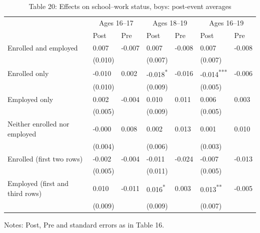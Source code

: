 \documentclass[12pt]{article}
\begin{document}
\begin{table}
\centering
\caption{Table 20: Effects on school--work status, boys: post-event averages}

\small
\begin{tabular}{p{}p{}p{}p{}p{}p{}p{}}
\toprule
 & \multicolumn{2}{c}{Ages 16--17} & \multicolumn{2}{c}{Ages 18--19} & \multicolumn{2}{c}{Ages 16--19} \\

 & Post & Pre & Post & Pre & Post & Pre \\
\midrule
Enrolled and employed & 0.007 & -0.007 & 0.007 & -0.008 & 0.007 & -0.008 \\
 & (0.010) &  & (0.007) &  & (0.007) &  \\
Enrolled only & -0.010 & 0.002 & -0.018\textsuperscript{*} & -0.016 & -0.014\textsuperscript{***} & -0.006 \\
 & (0.010) &  & (0.009) &  & (0.005) &  \\
Employed only & 0.002 & -0.004 & 0.010 & 0.011 & 0.006 & 0.003 \\
 & (0.005) &  & (0.009) &  & (0.005) &  \\
Neither enrolled nor employed & -0.000 & 0.008 & 0.002 & 0.013 & 0.001 & 0.010 \\
 & (0.004) &  & (0.006) &  & (0.003) &  \\
Enrolled (first two rows) & -0.002 & -0.004 & -0.011 & -0.024 & -0.007 & -0.013 \\
 & (0.005) &  & (0.011) &  & (0.005) &  \\
Employed (first and third rows) & 0.010 & -0.011 & 0.016\textsuperscript{*} & 0.003 & 0.013\textsuperscript{**} & -0.005 \\
 & (0.009) &  & (0.009) &  & (0.007) &  \\
\bottomrule
\end{tabular}



\noindent\small Notes: Post, Pre and standard errors as in Table 16.

\end{table}
\end{document}
